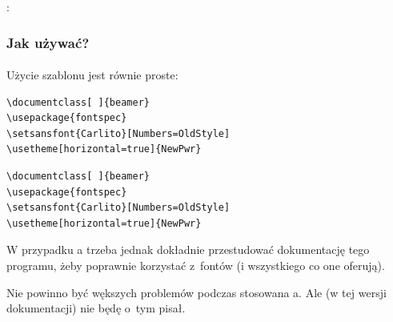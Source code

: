 \documentclass[12pt,aspectratio=169,ignorenonframetext]{beamer}
\begin{document}
:

\begin{frame}[fragile]
 \frametitle<presentation>{Jak używać?}
 \framesubtitle{}
 Użycie szablonu jest równie proste:
 \ifpdf
  \begin{lstlisting}  
\documentclass[ ]{beamer}
\usepackage{fontspec}
\setsansfont{Carlito}[Numbers=OldStyle]
\usetheme[horizontal=true]{NewPwr}
\end{lstlisting}
 \else
  \begin{verbatim}  
\documentclass[ ]{beamer}
\usepackage{fontspec}
\setsansfont{Carlito}[Numbers=OldStyle]
\usetheme[horizontal=true]{NewPwr}
\end{verbatim}
 \fi
\end{frame}

W przypadku a trzeba jednak dokładnie przestudować dokumentację tego programu, żeby poprawnie korzystać z~fontów (i wszystkiego co one oferują).

Nie powinno być wększych problemów podczas stosowana a.  Ale (w tej wersji dokumentacji) nie będę o~tym pisał.

\end{document}
